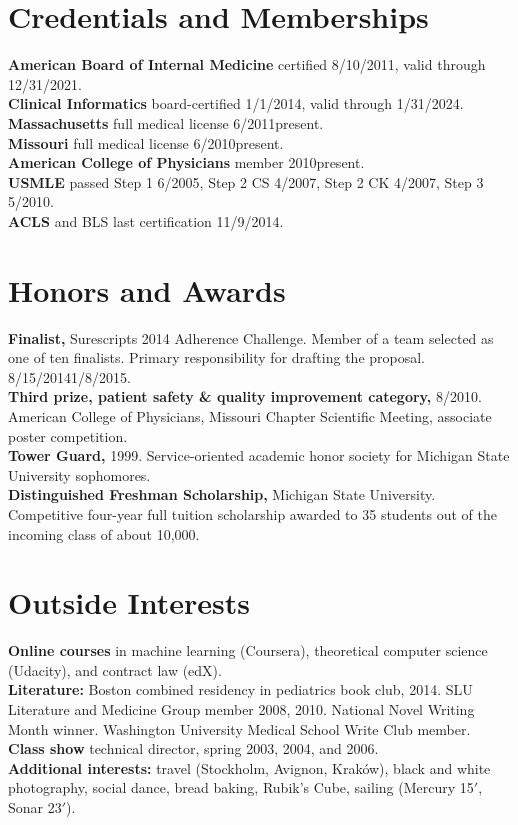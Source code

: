 \documentclass[10pt]{article}
\begin{document}
\section*{Credentials and Memberships}

\textbf{American Board of Internal Medicine} certified 8/10/2011,
valid through 12/31/2021.\\
\textbf{Clinical Informatics} board-certified 1/1/2014, valid through
1/31/2024.\\
\textbf{Massachusetts} full medical license 6/2011\ndash{}present.\\
\textbf{Missouri} full medical license 6/2010\ndash{}present.\\
\textbf{American College of Physicians} member 2010\ndash{}present.\\
\textbf{USMLE} passed Step 1 6/2005, Step 2 CS 4/2007, Step 2 CK 4/2007, Step 3
5/2010.\\
\textbf{ACLS} and BLS last certification 11/9/2014.

\section*{Honors and Awards}

\textbf{Finalist,} Surescripts 2014 Adherence Challenge. Member of a
team selected as one of ten finalists. Primary responsibility for
drafting the proposal. 8/15/2014\ndash{}1/8/2015.\\
\textbf{Third prize, patient safety \& quality improvement category,}
8/2010. American College of Physicians, Missouri Chapter Scientific
Meeting, associate poster competition.\\
\textbf{Tower Guard,} 1999. Service-oriented academic honor
society for Michigan State University sophomores.\\
\textbf{Distinguished Freshman Scholarship,} Michigan State
University. Competitive four-year full tuition scholarship awarded to
35 students out of the incoming class of about 10,000.

\section*{Outside Interests}

\textbf{Online courses} in machine learning (Coursera), theoretical
computer science (Udacity), and contract law (edX).\\
\textbf{Literature:} Boston combined residency in pediatrics book
club, 2014. SLU Literature and Medicine Group member 2008, 2010.
National Novel Writing Month winner. Washington University Medical
School Write Club member.\\
\textbf{Class show} technical director, spring 2003, 2004, and 2006.\\
\textbf{Additional interests:} travel (Stockholm, Avignon, Krak\'ow),
black and white photography, social dance, bread baking, Rubik’s Cube,
sailing (Mercury 15$'$, Sonar 23$'$).
\end{document}
